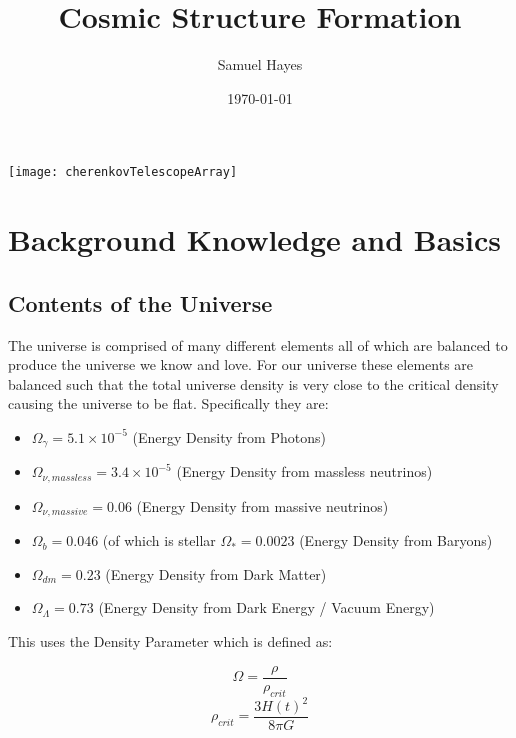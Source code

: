 \documentclass{article}
\title{Cosmic Structure Formation}
\author{Samuel Hayes}
\date{\today}
\begin{document}
\maketitle
\vspace{40mm} %
\begin{center}
    \texttt{[image: cherenkovTelescopeArray]}
\end{center}

\newpage

\tableofcontents
\newpage

\section{Background Knowledge and Basics}

\subsection{Contents of the Universe}
The universe is comprised of many different elements all of which are balanced to produce the universe we know and love. For our universe these elements are balanced such that the total universe density is very close to the critical density causing the universe to be flat. Specifically they are:

\begin{itemize}
    \item $\Omega_\gamma = 5.1\times10^{-5}$ (Energy Density from Photons)
    \item $\Omega_{\nu , massless} = 3.4 \times 10^{-5}$ (Energy Density from massless neutrinos)
    \item $\Omega_{\nu , massive} = 0.06$ (Energy Density from massive neutrinos)
    \item $\Omega_{b} = 0.046$ (of which is stellar $\Omega_{*} = 0.0023$ (Energy Density from Baryons)
    \item $\Omega_{dm} = 0.23$ (Energy Density from Dark Matter)
    \item $\Omega_{\Lambda} = 0.73$ (Energy Density from Dark Energy / Vacuum Energy)
    
\end{itemize}

This uses the Density Parameter which is defined as:

\begin{equation}
    \Omega = \frac{\rho}{\rho_{crit}}
\end{equation}
\begin{equation}
    \rho_{crit} = \frac{3H(t)^2}{8\pi G}
\end{equation}
\end{document}
